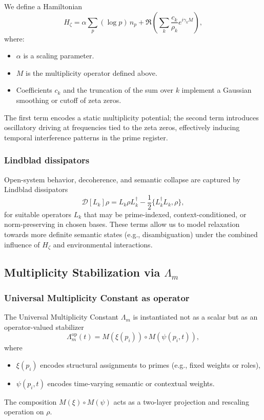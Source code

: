 \documentclass[11pt]{article}
\begin{document}
We define a Hamiltonian
\begin{equation}
  H_\zeta
  = \alpha \sum_{p} (\log p)\, n_p
    + \Re\left( \sum_{k} \frac{c_k}{\rho_k} e^{i \gamma_k M} \right),
\end{equation}
where:
\begin{itemize}[nosep]
  \item \(\alpha\) is a scaling parameter.
  \item \(M\) is the multiplicity operator defined above.
  \item Coefficients \(c_k\) and the truncation of the sum over \(k\) implement a Gaussian smoothing or cutoff of zeta zeros.
\end{itemize}

The first term encodes a static multiplicity potential; the second term introduces oscillatory driving at frequencies tied to the zeta zeros, effectively inducing temporal interference patterns in the prime register.

\subsubsection{Lindblad dissipators}

Open-system behavior, decoherence, and semantic collapse are captured by Lindblad dissipators
\begin{equation}
  \mathcal{D}[L_k]\rho
  = L_k \rho L_k^\dagger
    - \frac{1}{2} \{ L_k^\dagger L_k, \rho \},
\end{equation}
for suitable operators \(L_k\) that may be prime-indexed, context-conditioned, or norm-preserving in chosen bases. These terms allow us to model relaxation towards more definite semantic states (e.g., disambiguation) under the combined influence of \(H_\zeta\) and environmental interactions.

\subsection{Multiplicity Stabilization via \texorpdfstring{$\Lambda_m$}{Λm}}

\subsubsection{Universal Multiplicity Constant as operator}

The Universal Multiplicity Constant \(\Lambda_m\) is instantiated not as a scalar but as an operator-valued stabilizer
\begin{equation}
  \Lambda_m^{\mathrm{op}}(t)
  = M(\xi(p_i)) \circ M(\psi(p_i, t)),
\end{equation}
where
\begin{itemize}[nosep]
  \item \(\xi(p_i)\) encodes structural assignments to primes (e.g., fixed weights or roles),
  \item \(\psi(p_i, t)\) encodes time-varying semantic or contextual weights.
\end{itemize}
The composition \(M(\xi) \circ M(\psi)\) acts as a two-layer projection and rescaling operation on \(\rho\).
\end{document}
